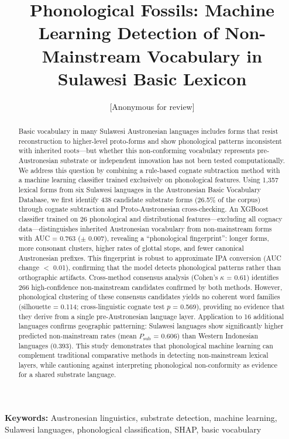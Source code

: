 \documentclass[12pt]{article}
\title{Phonological Fossils: Machine Learning Detection of Non-Mainstream Vocabulary in Sulawesi Basic Lexicon}
\author{[Anonymous for review]}
\date{}
\begin{document}
\maketitle

\begin{abstract}
Basic vocabulary in many Sulawesi Austronesian languages includes forms that resist reconstruction to higher-level proto-forms and show phonological patterns inconsistent with inherited roots---but whether this non-conforming vocabulary represents pre-Austronesian substrate or independent innovation has not been tested computationally.
We address this question by combining a rule-based cognate subtraction method with a machine learning classifier trained exclusively on phonological features.
Using 1,357 lexical forms from six Sulawesi languages in the Austronesian Basic Vocabulary Database, we first identify 438 candidate substrate forms (26.5\% of the corpus) through cognate subtraction and Proto-Austronesian cross-checking.
An XGBoost classifier trained on 26 phonological and distributional features---excluding all cognacy data---distinguishes inherited Austronesian vocabulary from non-mainstream forms with AUC = 0.763 ($\pm$ 0.007), revealing a ``phonological fingerprint'': longer forms, more consonant clusters, higher rates of glottal stops, and fewer canonical Austronesian prefixes.
This fingerprint is robust to approximate IPA conversion (AUC change $<$ 0.01), confirming that the model detects phonological patterns rather than orthographic artifacts.
Cross-method consensus analysis (Cohen's $\kappa$ = 0.61) identifies 266 high-confidence non-mainstream candidates confirmed by both methods.
However, phonological clustering of these consensus candidates yields no coherent word families (silhouette = 0.114; cross-linguistic cognate test $p$ = 0.569), providing no evidence that they derive from a single pre-Austronesian language layer.
Application to 16 additional languages confirms geographic patterning: Sulawesi languages show significantly higher predicted non-mainstream rates (mean $P_\mathrm{sub}$ = 0.606) than Western Indonesian languages (0.393).
This study demonstrates that phonological machine learning can complement traditional comparative methods in detecting non-mainstream lexical layers, while cautioning against interpreting phonological non-conformity as evidence for a shared substrate language.
\end{abstract}

\noindent\textbf{Keywords:} Austronesian linguistics, substrate detection, machine learning, Sulawesi languages, phonological classification, SHAP, basic vocabulary
\end{document}
